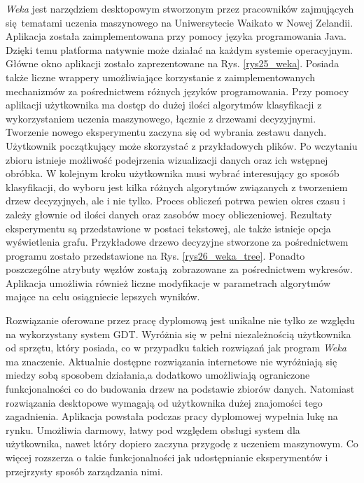 \textit{Weka} jest narzędziem desktopowym stworzonym przez pracowników zajmujących się tematami uczenia maszynowego na Uniwersytecie Waikato w Nowej Zelandii. Aplikacja została zaimplementowana przy pomocy języka programowania Java. Dzięki temu platforma natywnie może działać na każdym systemie operacyjnym. Główne okno aplikacji zostało zaprezentowane na Rys. \ref{rys25_weka}. Posiada także liczne wrappery umożliwiające korzystanie z zaimplementowanych mechanizmów za pośrednictwem różnych języków programowania. Przy pomocy aplikacji użytkownika ma dostęp do dużej ilości algorytmów klasyfikacji z wykorzystaniem uczenia maszynowego, łącznie z drzewami decyzyjnymi. Tworzenie nowego eksperymentu zaczyna się od wybrania zestawu danych. Użytkownik początkujący może skorzystać z przykładowych plików. Po wczytaniu zbioru istnieje możliwość podejrzenia wizualizacji danych oraz ich wstępnej obróbka. W kolejnym kroku użytkownika musi wybrać interesujący go sposób klasyfikacji, do wyboru jest kilka różnych algorytmów związanych z tworzeniem drzew decyzyjnych, ale i nie tylko. Proces obliczeń potrwa pewien okres czasu i zależy głownie od ilości danych oraz zasobów mocy obliczeniowej. Rezultaty eksperymentu są przedstawione w postaci tekstowej, ale także istnieje opcja wyświetlenia grafu. Przykładowe drzewo decyzyjne stworzone za pośrednictwem programu zostało przedstawione na Rys. \ref{rys26_weka_tree}. Ponadto poszczególne atrybuty węzłów zostają zobrazowane za pośrednictwem wykresów. Aplikacja umożliwia również liczne modyfikacje w parametrach algorytmów mające na celu osiągniecie lepszych wyników.  

Rozwiązanie oferowane przez pracę dyplomową jest unikalne nie tylko ze względu na wykorzystany system GDT. Wyróżnia się w pełni niezależnością użytkownika od sprzętu, który posiada, co w przypadku takich rozwiązań jak program \textit{Weka} ma znaczenie. Aktualnie dostępne rozwiązania internetowe nie wyróżniają się miedzy sobą sposobem działania,a dodatkowo umożliwiają ograniczone funkcjonalności co do budowania drzew na podstawie zbiorów danych. Natomiast rozwiązania desktopowe wymagają od użytkownika dużej znajomości tego zagadnienia. Aplikacja powstała podczas pracy dyplomowej wypełnia lukę na rynku. Umożliwia darmowy, łatwy pod względem obsługi system dla użytkownika, nawet który dopiero zaczyna przygodę z uczeniem maszynowym. Co więcej rozszerza o takie funkcjonalności jak udostępnianie eksperymentów i przejrzysty sposób zarządzania nimi. 